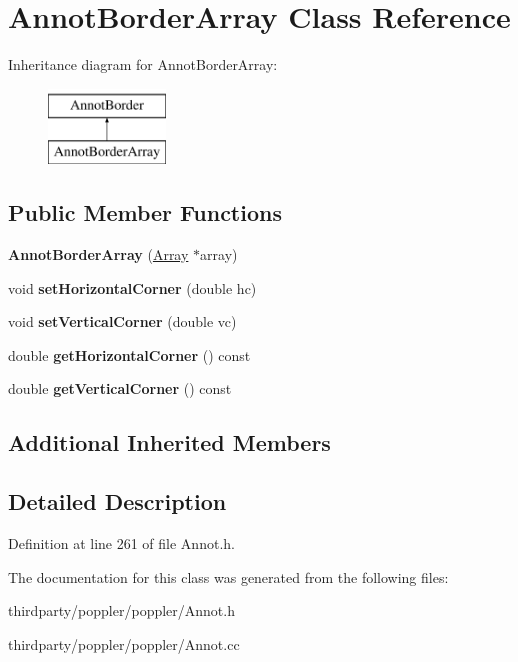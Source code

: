 \hypertarget{class_annot_border_array}{}\section{Annot\+Border\+Array Class Reference}
\label{class_annot_border_array}
Inheritance diagram for Annot\+Border\+Array\+:\begin{figure}[H]
\begin{center}
\leavevmode
\includegraphics[height=2.000000cm]{class_annot_border_array}
\end{center}
\end{figure}
\subsection*{Public Member Functions}
\begin{DoxyCompactItemize}
\item 
\mbox{\label{class_annot_border_array_a43c51cb9e927b96e31e9757e4011eb9e}} 
{\bfseries Annot\+Border\+Array} (\hyperlink{class_array}{Array} $\ast$array)
\item 
\mbox{\label{class_annot_border_array_a4949f02e0b2ad71b6e2bba3213550694}} 
void {\bfseries set\+Horizontal\+Corner} (double hc)
\item 
\mbox{\label{class_annot_border_array_ab4253e912051d4b6c1101e30db9abc23}} 
void {\bfseries set\+Vertical\+Corner} (double vc)
\item 
\mbox{\label{class_annot_border_array_a347b71a36b600791d4db5a43ca8a918d}} 
double {\bfseries get\+Horizontal\+Corner} () const
\item 
\mbox{\label{class_annot_border_array_a062fcfdf7c2e42f4f81c4ccec877b996}} 
double {\bfseries get\+Vertical\+Corner} () const
\end{DoxyCompactItemize}
\subsection*{Additional Inherited Members}


\subsection{Detailed Description}


Definition at line 261 of file Annot.\+h.



The documentation for this class was generated from the following files\+:\begin{DoxyCompactItemize}
\item 
thirdparty/poppler/poppler/Annot.\+h\item 
thirdparty/poppler/poppler/Annot.\+cc\end{DoxyCompactItemize}
